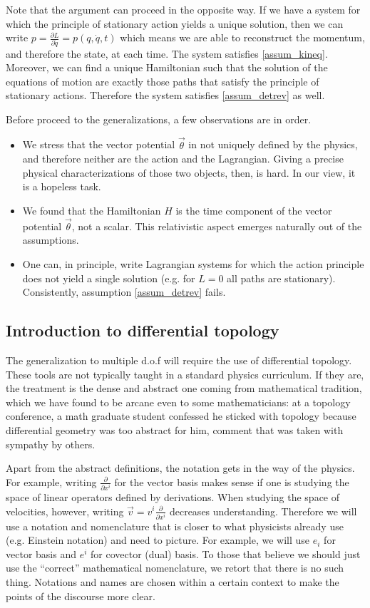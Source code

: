 \documentclass[10pt,twocolumn, nofootinbib]{revtex4-2}
\begin{document}
Note that the argument can proceed in the opposite way. If we have a system for which the principle of stationary action yields a unique solution, then we can write $p=\frac{\partial L}{\partial \dot{q}} = p(q, \dot{q}, t)$ which means we are able to reconstruct the momentum, and therefore the state, at each time. The system satisfies \ref{assum_kineq}. Moreover, we can find a unique Hamiltonian such that the solution of the equations of motion are exactly those paths that satisfy the principle of stationary actions. Therefore the system satisfies \ref{assum_detrev} as well.

Before proceed to the generalizations, a few observations are in order.
\begin{itemize}
	\item We stress that the vector potential $\vec{\theta}$ in not uniquely defined by the physics, and therefore neither are the action and the Lagrangian. Giving a precise physical characterizations of those two objects, then, is hard. In our view, it is a hopeless task.
	\item We found that the Hamiltonian $H$ is the time component of the vector potential $\vec{\theta}$, not a scalar. This relativistic aspect emerges naturally out of the assumptions.
	\item One can, in principle, write Lagrangian systems for which the action principle does not yield a single solution (e.g. for $L=0$ all paths are stationary). Consistently, assumption \ref{assum_detrev} fails.
\end{itemize}

\subsection*{Introduction to differential topology}

The generalization to multiple d.o.f will require the use of differential topology. These tools are not typically taught in a standard physics curriculum. If they are, the treatment is the dense and abstract one coming from mathematical tradition, which we have found to be arcane even to some mathematicians: at a topology conference, a math graduate student confessed he sticked with topology because differential geometry was too abstract for him, comment that was taken with sympathy by others.

Apart from the abstract definitions, the notation gets in the way of the physics. For example, writing $\frac{\partial}{\partial x^i}$ for the vector basis makes sense if one is studying the space of linear operators defined by derivations. When studying the space of velocities, however, writing $\vec{v} = v^i\frac{\partial}{\partial x^i}$ decreases understanding. Therefore we will use a notation and nomenclature that is closer to what physicists already use (e.g. Einstein notation) and need to picture. For example, we will use $e_i$ for vector basis and $e^i$ for covector (dual) basis. To those that believe we should just use the ``correct'' mathematical nomenclature, we retort that there is no such thing. Notations and names are chosen within a certain context to make the points of the discourse more clear.
\end{document}
